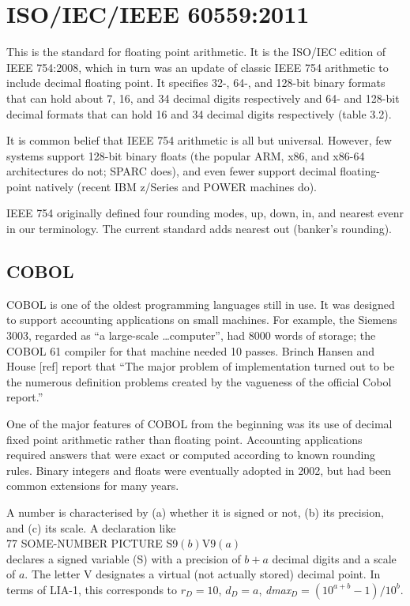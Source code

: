 \documentclass{article}
\begin{document}
\section{ISO/IEC/IEEE 60559:2011}

This is the standard for floating point arithmetic.
It is the ISO/IEC edition of IEEE 754:2008, which in
turn was an update of classic IEEE 754 arithmetic to
include decimal floating point.  It specifies
32-, 64-, and 128-bit binary formats that can hold about 7,
16, and 34 decimal digits respectively
and 64- and 128-bit decimal formats that can hold
16 and 34 decimal digits respectively (table 3.2).

It is common belief that IEEE 754 arithmetic is all but
universal.  However, few systems support 128-bit binary floats
(the popular ARM, x86, and x86-64 architectures do not; SPARC
does), and even fewer support decimal floating-point natively
(recent IBM z/Series and POWER machines do).

IEEE 754 originally defined four rounding modes, up, down, in,
and nearest evenr in our terminology.  The current standard
adds nearest out (banker's rounding).

\subsection{COBOL}

COBOL is one of the oldest programming languages still in use.
It was designed to support accounting applications on small
machines.  For example, the Siemens 3003, regarded as ``a large-scale
\dots computer'', had 8000 words of
storage; the COBOL 61 compiler for that machine needed 10 passes.
Brinch Hansen and House [ref] report that ``The major problem of
implementation turned out to be the numerous definition problems
created by the vagueness of the official Cobol report.''

One of the major features of COBOL from the beginning was its
use of decimal fixed point arithmetic rather than floating point.
Accounting applications required answers that were exact or
computed according to known rounding rules.  Binary integers
and floats were eventually adopted in 2002, but had been common
extensions for many years.  

A number is characterised by (a) whether it is signed or not,
(b) its precision, and (c) its scale.  A declaration like\\
77 SOME-NUMBER PICTURE S9$(b)$V$9(a)$\\
declares a signed variable (S) with a precision of $b+a$
decimal digits and a scale of $a$.  The letter V designates
a virtual (not actually stored) decimal point.  In terms of
LIA-1, this corresponds to $r_D = 10$, $d_D = a$,
{\it dmax}${}_D = (10^{a+b}-1)/10^b$.
\end{document}
